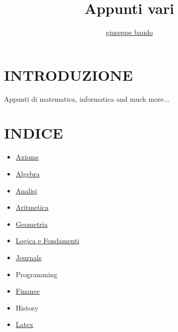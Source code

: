 \documentclass[a4paper,10pt]{article}
\title{Appunti vari}
\author{\href{http://www.baudo.hol.es}{giuseppe baudo}}
\begin{document}
\maketitle

\section{INTRODUZIONE}
Appunti di matematica, informatica and much more...

\section{INDICE}
\begin{itemize}
  \item \href{./axioms/Axioms.html}{Axioms}
  \item \href{./algebra/AlgebraIndex.html}{Algebra}
  \item \href{./analisi/Analisi.html}{Analisi} 
  \item \href{./aritmetica/Aritmetica.html}{Aritmetica}
  \item \href{./geometria/Geometria.html}{Geometria} 
  \item \href{./logica/Logics.html}{Logica e Fondamenti}
  \item \href{./misc/Journals.html}{Journals}
  \item Programming
  \item \href{./finance/finance.html}{Finance} 
  \item History 
  \item \href{./latex/latex.html}{Latex} 
  
\end{itemize}
\end{document}

